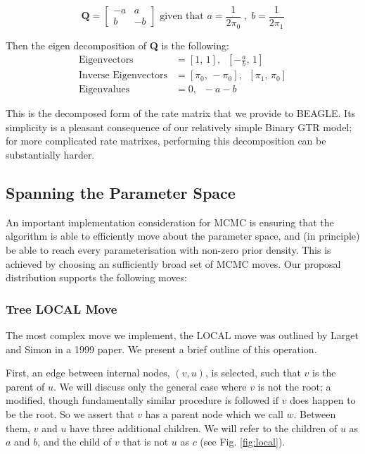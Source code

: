 \documentclass[10pt,journal,compsoc]{IEEEtran}
\begin{document}
\begin{equation}
    \textbf{Q} = \begin{bmatrix}
-a & a\\
b & -b
\end{bmatrix} \text{ \ given that \ } a = \frac{1}{2 \pi_0} \;,\; b = \frac{1}{2 \pi_1}
\end{equation}

\noindent Then the eigen decomposition of \textbf{Q} is the following:
\begin{align*}
    \text{Eigenvectors} &= [1,\, 1],\;\;  [-\frac{a}{b},\, 1] \\
    \text{Inverse Eigenvectors} &= [\pi_0,\, -\pi_0],\;\;  [\pi_1,\, \pi_0]\\
    \text{Eigenvalues} &= 0,\;\; -a-b
\end{align*}

This is the decomposed form of the rate matrix that we provide to BEAGLE. Its simplicity is a pleasant consequence of our relatively simple Binary GTR model; for more complicated rate matrixes, performing this decomposition can be substantially harder.

\subsection{Spanning the Parameter Space}

An important implementation consideration for MCMC is ensuring that the algorithm is able to efficiently move about the parameter space, and (in principle) be able to reach every parameterisation with non-zero prior density. This is achieved by choosing an sufficiently broad set of MCMC moves. Our proposal distribution supports the following moves:

\subsubsection{Tree LOCAL Move}

The most complex move we implement, the LOCAL move was outlined by Larget and Simon in a 1999 paper. We present a brief outline of this operation.

First, an edge between internal nodes, $(v, u)$, is selected, such that $v$ is the parent of $u$. We will discuss only the general case where $v$ is not the root; a modified, though fundamentally similar procedure is followed if $v$ does happen to be the root. So we assert that $v$ has a parent node which we call $w$. Between them, $v$ and $u$ have three additional children. We will refer to the children of $u$ as $a$ and $b$, and the child of $v$ that is not $u$ as $c$ (see Fig. \ref{fig:local}).
\end{document}
